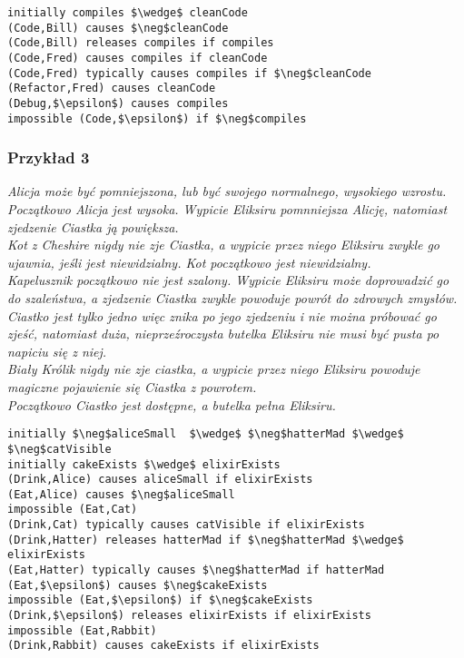 \documentclass{article}
\begin{document}
\bigskip
{}
\begin{lstlisting}[mathescape=true]
initially compiles $\wedge$ cleanCode
(Code,Bill) causes $\neg$cleanCode
(Code,Bill) releases compiles if compiles
(Code,Fred) causes compiles if cleanCode
(Code,Fred) typically causes compiles if $\neg$cleanCode
(Refactor,Fred) causes cleanCode
(Debug,$\epsilon$) causes compiles
impossible (Code,$\epsilon$) if $\neg$compiles
\end{lstlisting}

\subsubsection{Przykład 3}


\textit{Alicja może być pomniejszona, lub być swojego normalnego, wysokiego wzrostu. Początkowo Alicja jest wysoka. Wypicie Eliksiru pomnniejsza Alicję, natomiast zjedzenie Ciastka ją powiększa.
\\
Kot z Cheshire nigdy nie zje Ciastka, a wypicie przez niego Eliksiru zwykle go ujawnia, jeśli jest niewidzialny. Kot początkowo jest niewidzialny.
\\
Kapelusznik początkowo nie jest szalony. Wypicie Eliksiru może doprowadzić go do szaleństwa, a zjedzenie Ciastka zwykle powoduje powrót do zdrowych zmysłów.
\\
Ciastko jest tylko jedno więc znika po jego zjedzeniu i nie można próbować go zjeść, natomiast duża, nieprzeźroczysta butelka Eliksiru nie musi być pusta po napiciu się z niej.
\\
Biały Królik nigdy nie zje ciastka, a wypicie przez niego Eliksiru powoduje magiczne pojawienie się Ciastka z powrotem.
\\
Początkowo Ciastko jest dostępne, a butelka pełna Eliksiru.}

\bigskip
{}
\begin{lstlisting}[mathescape=true, breaklines=true]
initially $\neg$aliceSmall  $\wedge$ $\neg$hatterMad $\wedge$ $\neg$catVisible
initially cakeExists $\wedge$ elixirExists
(Drink,Alice) causes aliceSmall if elixirExists
(Eat,Alice) causes $\neg$aliceSmall
impossible (Eat,Cat)
(Drink,Cat) typically causes catVisible if elixirExists
(Drink,Hatter) releases hatterMad if $\neg$hatterMad $\wedge$ elixirExists
(Eat,Hatter) typically causes $\neg$hatterMad if hatterMad
(Eat,$\epsilon$) causes $\neg$cakeExists
impossible (Eat,$\epsilon$) if $\neg$cakeExists
(Drink,$\epsilon$) releases elixirExists if elixirExists
impossible (Eat,Rabbit)
(Drink,Rabbit) causes cakeExists if elixirExists
\end{lstlisting}
\end{document}

